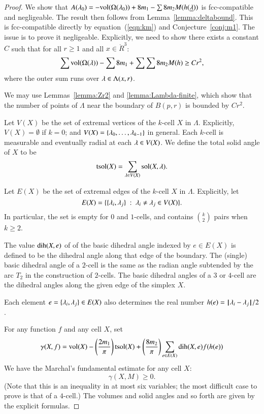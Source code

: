 \begin{proof} 
We show that $A(\lambda_0)  = -{\operatorname{vol}}(\Omega(\lambda_0)) + 8 m_1 - \sum 8 m_2 M(h({\underline{\lambda}}))$ is fcc-compatible and negligeable.  The
result then follows from Lemma~\ref{lemma:deltabound}.  
This is fcc-compatible directly
by equation~(\ref{eqn:km})
and Conjecture~\ref{conj:m1}.  The issue is to prove it negligeable.  Explicitly, we need
to show there exists a constant  $C$ such that for all $r\ge 1$ and all $x\in\ring{R}^3$:
\begin{equation}\label{eqn:neg}
  \sum {\operatorname{vol}}(\Omega(\lambda)) -\sum 8m_1 + \sum \sum 8 m_2 M(h) \ge C r^2,
\end{equation}
where the outer sum runs over $\lambda\in \Lambda(x,r)$.

We may use Lemmas~\ref{lemma:Zr2} and \ref{lemma:Lambda-finite}, which show that the number of points of $\Lambda$ near the boundary of $B(p,r)$ is bounded by $C r^2$.

Let $V(X)$ be the set of extremal vertices of the $k$-cell $X$ in $\Lambda$.  Explicitly, $V(X)=\emptyset$ if $k=0$; and $V(X) = \{\lambda_0,\ldots,\lambda_{k-1}\}$ in general.  Each $k$-cell is measurable and eventually
radial at each $\lambda\in V(X)$.  We define the total solid angle of $X$ to be
$$
{\operatorname{tsol}}(X) = \sum_{\lambda\in V(X)} \operatorname{sol}(X,\lambda).
$$

Let $E(X)$ be the set of extremal edges of the $k$-cell $X$ in $\Lambda$.  Explicitly, let 
$$E(X)=\{\{\lambda_i,\lambda_j\}\ :\  \lambda_i\ne\lambda_j\in V(X)\}.$$
In particular, the set is empty for $0$ and $1$-cells, and contains
$k\choose{2}$ pairs when $k\ge 2$.


The value
$\operatorname{dih}(X,e)$ of
of the basic dihedral angle indexed by $e\in E(X)$ is defined to be the dihedral angle along that edge
of the boundary.  
The (single) basic  dihedral angle of a $2$-cell is
the same as the radian angle subtended by the arc $T_2$ in the construction of $2$-cells.
The basic dihedral angles of a $3$ or $4$-cell are the dihedral angles along the given edge of the simplex $X$. 

Each element $e=\{\lambda_i,\lambda_j\}\in E(X)$ also determines
the real number $h(e) = {\hskip0.1em|\hskip-0.15em|\hskip0.1em}\lambda_i - \lambda_j{\hskip0.1em|\hskip-0.15em|\hskip0.1em}/2$.

For any function $f$ and any cell $X$, set
\begin{equation}\label{eqn:gamma-def}
\gamma(X,f) =  {\operatorname{vol}}(X)
-\left(\frac{2m_1}{\pi}\right) {\operatorname{tsol}}(X) + \left(\frac{8m_2}{\pi}\right)
\sum_{e\in E(X)} \operatorname{dih}(X,e)  f(h(e))
\end{equation}
We have the Marchal's fundamental estimate\cite[cc:mar]{hales:2009:nonlinear} for any cell $X$:  %
\begin{equation}\label{eqn:mfe}
\gamma(X,M)\ge 0.
\end{equation}
(Note that this is an inequality in at most six variables; the most difficult case to prove is that of a $4$-cell.)  The volumes and solid angles and so forth are given by the explicit formulas.


\end{proof}
